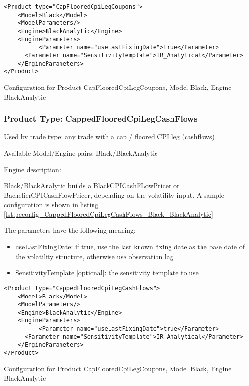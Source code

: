 \begin{longlisting}
\begin{verbatim}
<Product type="CapFlooredCpiLegCoupons">
    <Model>Black</Model>
    <ModelParameters/>
    <Engine>BlackAnalytic</Engine>
    <EngineParameters>
          <Parameter name="useLastFixingDate">true</Parameter>
      <Parameter name="SensitivityTemplate">IR_Analytical</Parameter>
    </EngineParameters>
</Product>
\end{verbatim}
\caption{Configuration for Product CapFlooredCpiLegCoupons, Model Black, Engine BlackAnalytic}
\label{lst:peconfig_CapFlooredCpiLegCoupons_Black_BlackAnalytic}
\end{longlisting}

\subsubsection{Product Type: CappedFlooredCpiLegCashFlows}

Used by trade type: any trade with a cap / floored CPI leg (cashflows)

Available Model/Engine pairs: Black/BlackAnalytic

Engine description:

Black/BlackAnalytic builds a BlackCPICashFLowPricer or BachelierCPICashFlowPricer, depending on the volatility input. A sample configuration is
shown in listing \ref{lst:peconfig_CappedFlooredCpiLegCashFlows_Black_BlackAnalytic}

The parameters have the following meaning:

\begin{itemize}
\item useLastFixingDate: if true, use the last known fixing date as the base date of the volatility structure, otherwise
  use observation lag        
\item SensitivityTemplate [optional]: the sensitivity template to use 
\end{itemize}

\begin{longlisting}
\begin{verbatim}
<Product type="CappedFlooredCpiLegCashFlows">
    <Model>Black</Model>
    <ModelParameters/>
    <Engine>BlackAnalytic</Engine>
    <EngineParameters>
          <Parameter name="useLastFixingDate">true</Parameter>
      <Parameter name="SensitivityTemplate">IR_Analytical</Parameter>
    </EngineParameters>
</Product>
\end{verbatim}
\caption{Configuration for Product CapFlooredCpiLegCoupons, Model Black, Engine BlackAnalytic}
\label{lst:peconfig_CappedFlooredCpiLegCashFlows_Black_BlackAnalytic}
\end{longlisting}

